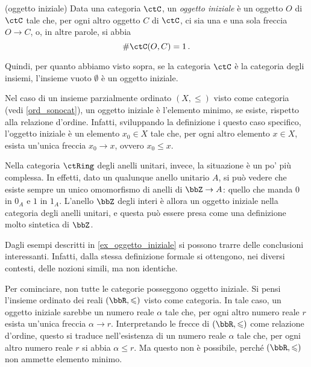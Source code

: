 \begin{example}(oggetto iniziale)\label{ex_oggetto_iniziale}
	Data una categoria \(\ctC\), un \emph{oggetto iniziale} è un oggetto \(O\) di \(\ctC\) tale che, per ogni altro oggetto \(C\) di \(\ctC\), ci sia una e una sola freccia \(O\to C\), o, in altre parole, si abbia 
	\begin{equation}\label{def_oggetto_iniziale}
		\#\Hom\ctC(O,C)=1\,.
	\end{equation}

	Quindi, per quanto abbiamo visto sopra, se la categoria \(\ctC\) è la categoria degli insiemi, l'insieme vuoto \(\emptyset\)  è un oggetto iniziale. 
	
	Nel caso di un insieme parzialmente ordinato \((X, \leqslant)\) visto come categoria (vedi \ref{ord_sonocat}), un oggetto iniziale è l'elemento minimo, se esiste, rispetto alla relazione d'ordine. Infatti, sviluppando la definizione i questo caso specifico, l'oggetto iniziale è un elemento \(x_0\in X\) tale che, per ogni altro elemento \(x\in X\), esista un'unica freccia \(x_0\to x\), ovvero \(x_0\leqslant x\). 
	
	Nella categoria \(\ctRing\) degli anelli unitari, invece, la situazione è un po' più complessa. In effetti, dato un qualunque anello  unitario \(A\), si può vedere che esiste sempre un unico omomorfismo di anelli di \(\bbZ\to A\): quello che manda \(0\) in \(0_A\) e \(1\) in \(1_A\). L'anello \(\bbZ\) degli interi è allora un oggetto iniziale nella categoria degli anelli unitari, e questa può essere presa come una definizione molto sintetica di \(\bbZ\).
\end{example}

Dagli esempi descritti in  \ref{ex_oggetto_iniziale} si possono trarre delle conclusioni interessanti. Infatti, dalla stessa definizione formale si ottengono, nei diversi contesti, delle nozioni simili, ma non identiche. 

Per cominciare, non tutte le categorie posseggono oggetto iniziale. Si pensi l'insieme ordinato dei reali \((\bbR,\leqslant)\) visto come categoria. In tale caso,  un oggetto iniziale sarebbe un numero reale \(\alpha\) tale che, per ogni altro numero reale \(r\) esista un'unica freccia \(\alpha\to r\). Interpretando le frecce di \((\bbR,\leqslant)\) come relazione d'ordine, questo si traduce nell'esistenza di un numero reale \(\alpha\) tale che, per ogni altro numero reale \(r\) si abbia \(\alpha\leqslant r\). Ma questo non è possibile, perché \((\bbR,\leqslant)\) non ammette elemento minimo.

